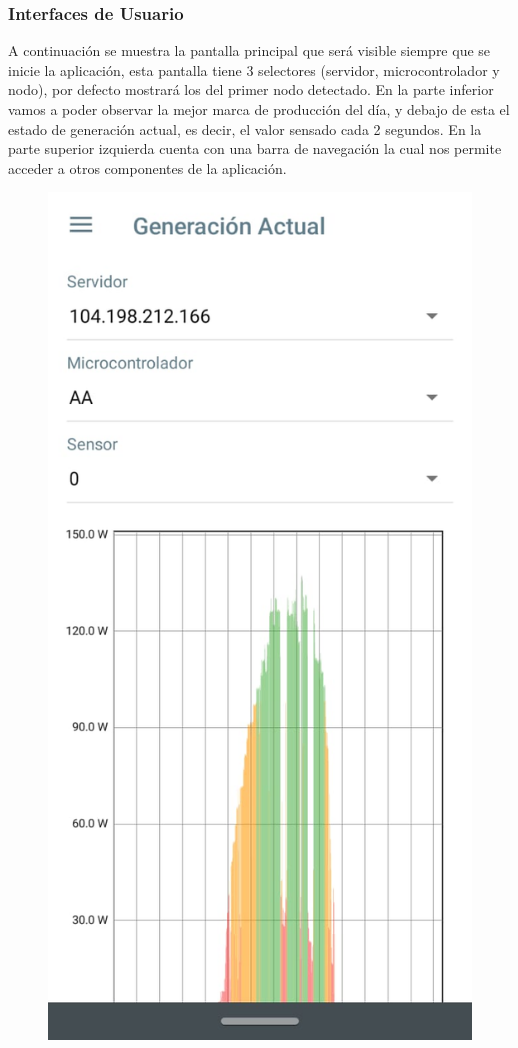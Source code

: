 \subsubsection{Interfaces de Usuario}\label{Interfaces de Usuario}
A continuación se muestra la pantalla principal que será visible siempre que se inicie la aplicación, esta pantalla tiene 3 selectores (servidor, microcontrolador y nodo), por defecto mostrará los del primer nodo detectado. En la parte inferior vamos a poder observar la mejor marca de producción del día, y debajo de esta el estado de generación actual, es decir, el valor sensado cada 2 segundos. En la parte superior izquierda cuenta con una barra de navegación la cual nos permite acceder a otros componentes de la aplicación.  

\begin{figure}[H]
	\centering
	\includegraphics[scale=0.4]{Capitulo4/software/submodulos/images/man15.png}

\end{figure}
